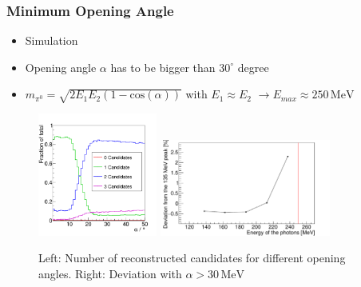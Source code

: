 \documentclass[slidestop,compress,mathserif]{beamer}
\begin{document}
\begin{frame}
	\frametitle{Minimum Opening Angle}
	\begin{itemize}
		\item Simulation
		\item Opening angle $\alpha$ has to be bigger than $30^{\circ}$ degree
		\item $m_{\pi^0}=\sqrt{2 E_1 E_2 (1-\text{cos}(\alpha))}$ with $E_1 \approx E_2$ $\rightarrow E_{max}\approx 250 \, \text{MeV}$
	\end{itemize}

	\begin{figure}
		\includegraphics[width=0.35\textwidth]{Pictures/MCClusteringCheck_nCandsOpAng}
		\includegraphics[width=0.50\textwidth]{Pictures/20170505MinAngle30Deviation}
		\caption{Left: Number of reconstructed candidates for different opening angles. Right: Deviation with $\alpha > 30 \, \text{MeV}$ }
	\end{figure}
	
\end{frame}
\end{document}
